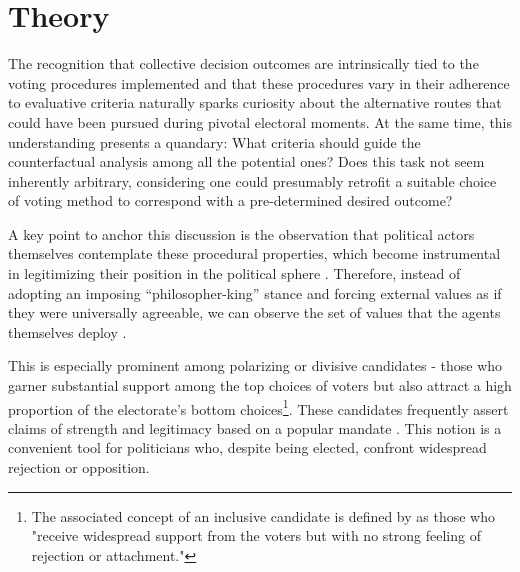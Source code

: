 \documentclass[hidelinks,11pt]{article} \usepackage[utf8]{inputenc}
\begin{document}
\section{Theory}

The recognition that collective decision outcomes are intrinsically tied to the voting procedures implemented and that these procedures vary in their adherence to evaluative criteria naturally sparks curiosity about the alternative routes that could have been pursued during pivotal electoral moments\parencite{tabarrok1999would, kaminski1999communism, ostrom1986agenda}. At the same time, this understanding presents a quandary: What criteria should guide the counterfactual analysis among all the potential ones? Does this task not seem inherently arbitrary, considering one could presumably retrofit a suitable choice of voting method to correspond with a pre-determined desired outcome\parencite{riker1982liberalism}?

A key point to anchor this discussion is the observation that political actors themselves contemplate these procedural properties, which become instrumental in legitimizing their position in the political sphere \parencite{mclean02_william_h, ostrom2009understanding}. Therefore, instead of adopting an imposing ``philosopher-king'' stance and forcing external values as if they were universally agreeable, we can observe the set of values that the agents themselves deploy \parencite{binmore2005natural}.

This is especially prominent among polarizing or divisive candidates - those who garner substantial support among the top choices of voters but also attract a high proportion of the electorate's bottom choices\footnote{The associated concept of an inclusive candidate is defined by \textcite[p.6]{igersheim22_compar_votin_method} as those who "receive widespread support from the voters but with no strong feeling of rejection or attachment."}. These candidates frequently assert claims of strength and legitimacy based on a popular mandate \parencite{tabarrok2001president}. This notion is a convenient tool for politicians who, despite being elected, confront widespread rejection or opposition.
\end{document}
